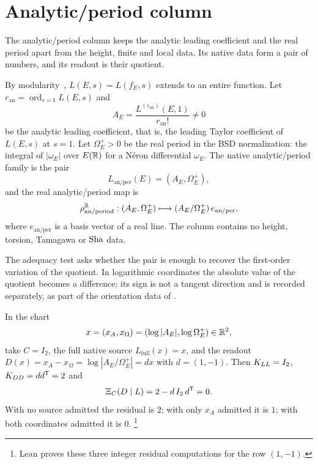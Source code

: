 \section{Analytic/period column}
\label{sec:analytic-period}

The analytic/period column keeps the analytic leading coefficient and the
real period apart from the height, finite and local data.  Its native data
form a pair of numbers, and its readout is their quotient.

\begin{definition}\label{def:apparatus:analytic-period-map}
By modularity~\citep{Wiles1995,BreuilConradDiamondTaylor2001},
$L(E,s)=L(f_E,s)$ extends to an entire function.  Let
$r_{\mathrm{an}}=\operatorname{ord}_{s=1}L(E,s)$ and
\[
  A_E=\frac{L^{(r_{\mathrm{an}})}(E,1)}{r_{\mathrm{an}}!}\neq0
\]
be the analytic leading coefficient, that is, the leading Taylor
coefficient of $L(E,s)$ at $s=1$.  Let $\Omega_E^+>0$ be the real period
in the BSD normalization: the integral of $|\omega_E|$ over $E(\mathbb{R})$ for a
N\'eron differential $\omega_E$.  The native analytic/period family is the
pair
\[
  L_{\mathrm{an/per}}(E)=(A_E,\Omega_E^+),
\]
and the real analytic/period map is
\[
  \rho_{\mathrm{an/period}}^{\mathbb{R}}:(A_E,\Omega_E^+)\longmapsto
  (A_E/\Omega_E^+)\,e_{\mathrm{an/per}},
\]
where $e_{\mathrm{an/per}}$ is a basis vector of a real line.  The column
contains no height, torsion, Tamagawa or $\operatorname{Sha}$ data.
\end{definition}

The adequacy test asks whether the pair is enough to recover the first-order
variation of the quotient.  In logarithmic coordinates the absolute value
of the quotient becomes a difference; its sign is not a tangent direction
and is recorded separately, as part of the orientation data of
.

\begin{theorem}\label{thm:apparatus:analytic-period-schur-collapse}
In the chart
\[
  x=(x_A,x_\Omega)=(\log|A_E|,\log\Omega_E^+)\in\mathbb{R}^2,
\]
take $C=I_2$, the full native source $L_{\mathrm{full}}(x)=x$, and the
readout $D(x)=x_A-x_\Omega=\log|A_E/\Omega_E^+|=dx$ with $d=(1,-1)$.  Then $K_{LL}=I_2$,
$K_{DD}=dd^{\mathsf T}=2$ and
\[
  \Xi_C(D\mid L)=2-d\,I_2\,d^{\mathsf T}=0.
\]
With no source admitted the residual is $2$; with only $x_A$ admitted it
is $1$; with both coordinates admitted it is $0$.%
\footnote{Lean proves these three integer residual computations for the
row $(1,-1)$.}
\end{theorem}

